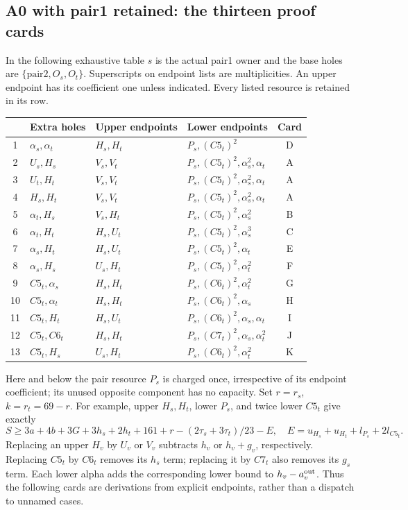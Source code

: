 \documentclass[11pt,letterpaper]{article}
\theoremstyle{definition}\newtheorem{definition}[theorem]{Definition}
\begin{document}
\subsection{A0 with pair1 retained: the thirteen proof cards}
In the following exhaustive table $s$ is the actual pair1 owner and the
base holes are $\{\mathrm{pair2},O_s,O_t\}$. Superscripts on endpoint
lists are multiplicities. An upper endpoint has its coefficient one
unless indicated. Every listed resource is retained in its row.
\begin{center}\small
\begin{tabular}{c|l|l|l|c}
 & Extra holes & Upper endpoints & Lower endpoints & Card\\\hline
1&$\alpha_s,\alpha_t$&$H_s,H_t$&$P_s,(C5_t)^2$&D\\
2&$U_s,H_s$&$V_s,V_t$&$P_s,(C5_t)^2,\alpha_s^2,\alpha_t$&A\\
3&$U_t,H_t$&$V_s,V_t$&$P_s,(C5_t)^2,\alpha_s^2,\alpha_t$&A\\
4&$H_s,H_t$&$V_s,V_t$&$P_s,(C5_t)^2,\alpha_s^2,\alpha_t$&A\\
5&$\alpha_t,H_s$&$V_s,H_t$&$P_s,(C5_t)^2,\alpha_s^2$&B\\
6&$\alpha_t,H_t$&$H_s,U_t$&$P_s,(C5_t)^2,\alpha_s^3$&C\\
7&$\alpha_s,H_t$&$H_s,U_t$&$P_s,(C5_t)^2,\alpha_t$&E\\
8&$\alpha_s,H_s$&$U_s,H_t$&$P_s,(C5_t)^2,\alpha_t^2$&F\\
9&$C5_t,\alpha_s$&$H_s,H_t$&$P_s,(C6_t)^2,\alpha_t^2$&G\\
10&$C5_t,\alpha_t$&$H_s,H_t$&$P_s,(C6_t)^2,\alpha_s$&H\\
11&$C5_t,H_t$&$H_s,U_t$&$P_s,(C6_t)^2,\alpha_s,\alpha_t$&I\\
12&$C5_t,C6_t$&$H_s,H_t$&$P_s,(C7_t)^2,\alpha_s,\alpha_t^2$&J\\
13&$C5_t,H_s$&$U_s,H_t$&$P_s,(C6_t)^2,\alpha_t^2$&K
\end{tabular}
\end{center}
Here and below the pair resource $P_s$ is charged once, irrespective of
its endpoint coefficient; its unused opposite component has no capacity.
Set $r=r_s$, $k=r_t=69-r$. For example, upper $H_s,H_t$, lower
$P_s$, and twice lower $C5_t$ give exactly
\[
 S\ge3a+4b+3G+3h_s+2h_t+161+r
 -(2\tau_s+3\tau_t)/23-E,
\quad E=u_{H_s}+u_{H_t}+l_{P_s}+2l_{C5_t}.
\]
Replacing an upper $H_v$ by $U_v$ or $V_v$ subtracts $h_v$ or
$h_v+g_v$, respectively. Replacing $C5_t$ by $C6_t$ removes its
$h_s$ term; replacing it by $C7_t$ also removes its $g_s$ term.
Each lower alpha adds the corresponding lower bound to $h_v-a_v^{\rm out}$.
Thus the following cards are derivations from explicit endpoints, rather
than a dispatch to unnamed cases.
\end{document}
